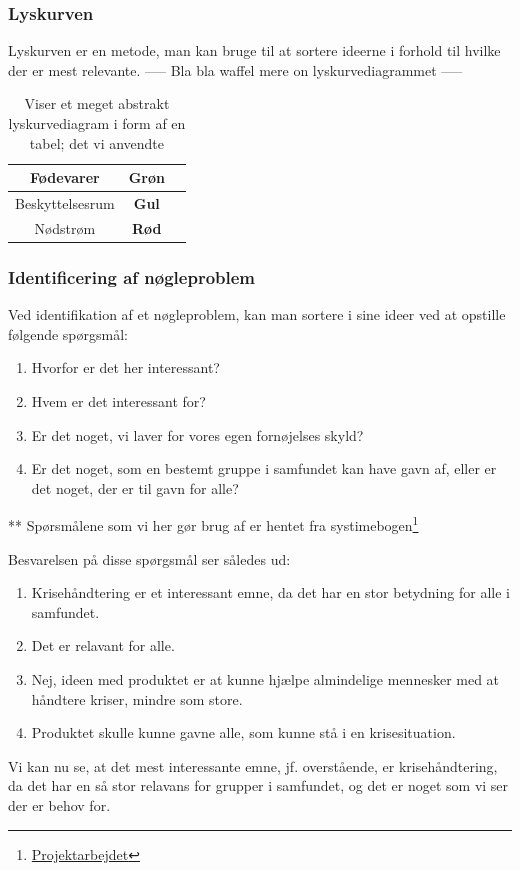 \subsubsection{Lyskurven}
Lyskurven er en metode, man kan bruge til at sortere ideerne i forhold til hvilke der er mest relevante.
----- Bla bla waffel mere on lyskurvediagrammet -----

\begin{table}[H]
    \centering
    \begin{tabular}{|c|c|c|}
        \hline
        Fødevarer & \textbf{Grøn} \\
        \hline
        Beskyttelsesrum & \textbf{Gul} \\
        \hline
        Nødstrøm & \textbf{Rød} \\
        \hline
    \end{tabular}
    \caption{Viser et meget abstrakt lyskurvediagram i form af en tabel; det vi anvendte}
\end{table}

\subsubsection{Identificering af nøgleproblem}
Ved identifikation af et nøgleproblem, kan man sortere i sine ideer ved at opstille følgende spørgsmål:
\begin{enumerate}
    \item Hvorfor er det her interessant?
    \item Hvem er det interessant for?
    \item Er det noget, vi laver for vores egen fornøjelses skyld?
    \item Er det noget, som en bestemt gruppe i samfundet kan have gavn af, eller er det noget, der er til gavn for alle?
\end{enumerate}
** Spørsmålene som vi her gør brug af er hentet fra systimebogen\footnote{\href{https://projektarbejdet.systime.dk/?id=271}{Projektarbejdet}}

Besvarelsen på disse spørgsmål ser således ud:
\begin{enumerate}
    \item Krisehåndtering er et interessant emne, da det har en stor betydning for alle i samfundet.
    \item Det er relavant for alle.
    \item Nej, ideen med produktet er at kunne hjælpe almindelige mennesker med at håndtere kriser, mindre som store.
    \item Produktet skulle kunne gavne alle, som kunne stå i en krisesituation.
\end{enumerate}

Vi kan nu se, at det mest interessante emne, jf. overstående, er krisehåndtering, da det har en så stor relavans for grupper i samfundet, og det er noget som vi ser der er behov for.
